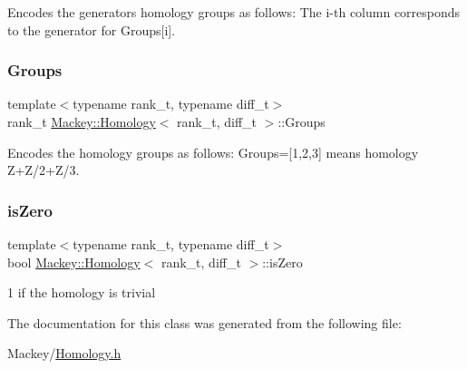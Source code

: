 Encodes the generators homology groups as follows\+: The i-\/th column corresponds to the generator for Groups\mbox{[}i\mbox{]}. 

\mbox{\label{classMackey_1_1Homology_aaae78e6463ce6e60e7f4c5861304bc5b}} 
\subsubsection{\texorpdfstring{Groups}{Groups}}
{\footnotesize\ttfamily template$<$typename rank\+\_\+t, typename diff\+\_\+t$>$ \\
rank\+\_\+t \hyperlink{classMackey_1_1Homology}{Mackey\+::\+Homology}$<$ rank\+\_\+t, diff\+\_\+t $>$\+::Groups}



Encodes the homology groups as follows\+: Groups=\mbox{[}1,2,3\mbox{]} means homology Z+\+Z/2+\+Z/3. 

\mbox{\label{classMackey_1_1Homology_ae3bb3781bab2b5884295e04a8fddf36e}} 
\subsubsection{\texorpdfstring{is\+Zero}{isZero}}
{\footnotesize\ttfamily template$<$typename rank\+\_\+t, typename diff\+\_\+t$>$ \\
bool \hyperlink{classMackey_1_1Homology}{Mackey\+::\+Homology}$<$ rank\+\_\+t, diff\+\_\+t $>$\+::is\+Zero}



1 if the homology is trivial 



The documentation for this class was generated from the following file\+:\begin{DoxyCompactItemize}
\item 
Mackey/\hyperlink{Homology_8h}{Homology.\+h}\end{DoxyCompactItemize}
